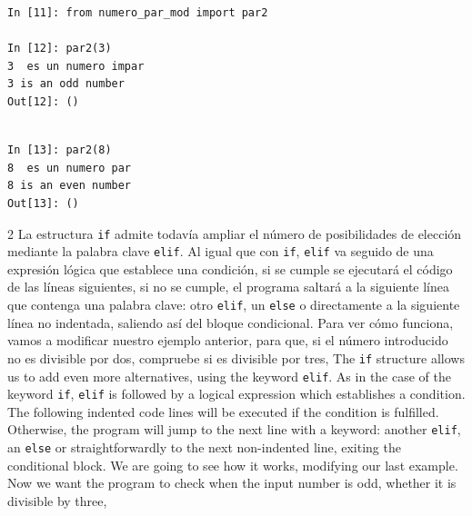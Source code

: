 \begin{center}
    \begin{minipage}{.5\textwidth}
\begin{verbatim}
In [11]: from numero_par_mod import par2

In [12]: par2(3)
3  es un numero impar
3 is an odd number
Out[12]: ()
\end{verbatim}
\end{minipage}
\end{center}
\begin{center}
	\begin{minipage}{.5\textwidth}
		\begin{verbatim}

In [13]: par2(8)
8  es un numero par
8 is an even number
Out[13]: ()
\end{verbatim}
\end{minipage}
\end{center}
    
\begin{paracol}{2}
La estructura \texttt{if} admite todavía ampliar el número de posibilidades de elección mediante la palabra clave \texttt{elif}. Al igual que  con \texttt{if}, \texttt{elif} va seguido de una expresión lógica que establece una condición, si se cumple se ejecutará el código de las líneas siguientes, si no se cumple, el programa saltará a la siguiente línea que contenga una palabra clave: otro \texttt{elif}, un \texttt{else} o directamente a la siguiente línea no indentada, saliendo así del bloque condicional. Para ver cómo funciona, vamos a modificar nuestro ejemplo anterior, para que, si el número introducido no es divisible por dos, compruebe si es divisible por tres,
\switchcolumn
The \texttt{if} structure allows us to add even more alternatives, using the keyword \texttt{elif}. As in the case of the keyword \texttt{if}, \texttt{elif} is followed by a logical expression which establishes a condition. The following indented code lines will be executed if the condition is fulfilled. Otherwise, the program will jump to the next line with a keyword: another \texttt{elif}, an \texttt{else} or straightforwardly to the next non-indented line, exiting the conditional block. We are going to see how it works, modifying our last example. Now we want the program to check when the input number is odd, whether it is divisible by three, 
\end{paracol}

